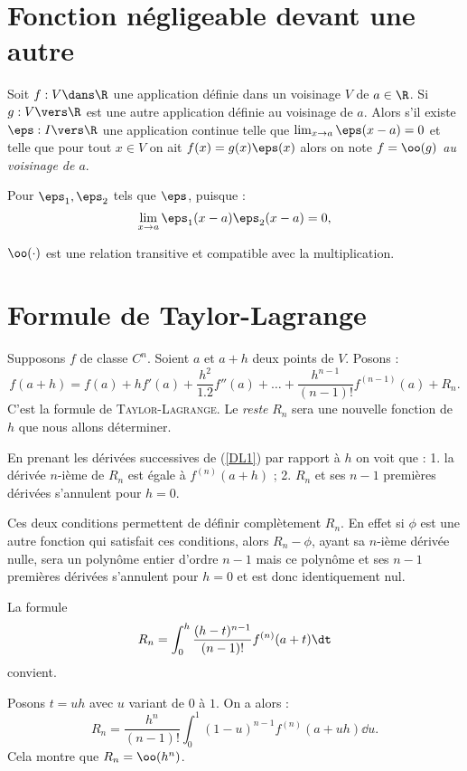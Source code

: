 \documentclass{mybourbaki}
\begin{document}
\section*{Fonction négligeable devant une autre}

\propt{} Soit $f : V \dans \R$ une application définie dans un voisinage $V$ de $a\in \R$. Si $g : V\vers\R$ est une autre application définie au voisinage de $a$. Alors s'il existe $\eps : I \vers \R$ une application continue telle que $\lim_{x\to a}\eps(x-a) = 0$ et telle que pour tout $x\in V$ on ait $f(x) = g(x)\eps(x)$ alors on note \textit{$f = \oo(g)$ au voisinage de $a$}.

Pour $\eps_1,\eps_2$ tels que $\eps$, puisque : \[ \lim_{x\to a} \eps_1(x-a)\eps_2(x-a)  = 0,\]

\propt{} $\oo(\cdot)$ est une relation transitive et compatible avec la multiplication.


\section*{Formule de Taylor-Lagrange}

\propt{} Supposons $f$ de classe $C^n$. Soient $a$ et $a+h$ deux points de $V$. Posons : 
\begin{equation}
f(a+h) = f(a) + hf'(a) + \frac{h^{2}}{1.2}f''(a) + \ldots + \frac{h^{n-1}}{(n-1)!}f^{(n-1)}(a) + R_n. \label{DL1}
\end{equation}
C'est la formule de \textsc{Taylor-Lagrange}.
Le \textit{reste} $R_n$ sera une nouvelle fonction de $h$ que nous allons déterminer.

En prenant les dérivées successives de (\ref{DL1}) par rapport à $h$ on voit que : 1. la dérivée $n$-ième de $R_n$ est égale à $f^{(n)}(a+h)$ ; 2. $R_n$ et ses $n-1$ premières dérivées s'annulent pour $h=0$.

Ces deux conditions permettent de définir complètement $R_n$. En effet si $\phi$ est une autre fonction qui satisfait ces conditions, alors $R_n-\phi$, ayant sa $n$-ième dérivée nulle, sera un polynôme entier d'ordre $n-1$ mais ce polynôme et ses $n-1$ premières dérivées s'annulent pour $h=0$ et est donc identiquement nul.

La formule \[ R_n = \int_{0}^{h}\frac{(h-t)^{n-1}}{(n-1)!}f^{(n)}(a+t)\dt\]convient.

\propt{} Posons $t = uh$ avec $u$ variant de $0$ à $1$. On a alors : \[R_n = \frac{h^{n}}{(n-1)!}\int_{0}^{1}(1-u)^{n-1}f^{(n)}(a+uh)\dd u.\]Cela montre que $R_n = \oo(h^{n})$.
\end{document}
